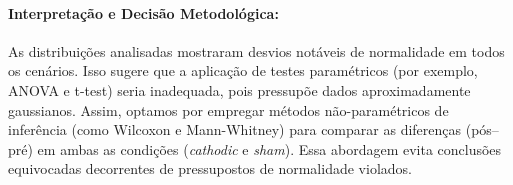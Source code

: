 \paragraph{Interpretação e Decisão Metodológica:}
As distribuições analisadas mostraram desvios notáveis de normalidade em todos os cenários. Isso sugere que a aplicação de testes paramétricos (por exemplo, ANOVA e t-test) seria inadequada, pois pressupõe dados aproximadamente gaussianos. Assim, optamos por empregar métodos não-paramétricos de inferência (como Wilcoxon e Mann-Whitney) para comparar as diferenças (pós--pré) em ambas as condições (\emph{cathodic} e \emph{sham}). Essa abordagem evita conclusões equivocadas decorrentes de pressupostos de normalidade violados.